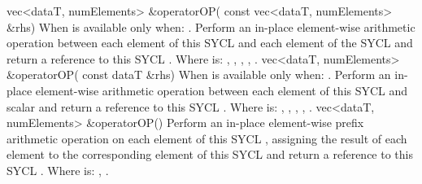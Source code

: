   \addRowTwoL
  {vec<dataT, numElements> \&operatorOP(}
  {  const vec<dataT, numElements> \&rhs)}
  {
    When  is \codeinline{\%=} available only when: .
    \newline
    Perform an in-place element-wise  arithmetic operation between each element of this SYCL  and each element of the  SYCL  and return a reference to this SYCL .
    \newline \newline
    Where  is: \codeinline{+=}, \codeinline{-=}, \codeinline{*=}, \codeinline{/=}, \codeinline{\%=}.
  }
  \addRowTwoL
  {vec<dataT, numElements> \&operatorOP(}
  {  const dataT \&rhs)}
  {
    When  is \codeinline{\%=} available only when: .
    \newline
    Perform an in-place element-wise  arithmetic operation between each element of this SYCL  and  scalar and return a reference to this SYCL .
    \newline \newline
    Where  is: \codeinline{+=}, \codeinline{-=}, \codeinline{*=}, \codeinline{/=}, \codeinline{\%=}.
  }
  \addRow
  {vec<dataT, numElements> \&operatorOP()}
  {
    Perform an in-place element-wise  prefix arithmetic operation on each element of this SYCL , assigning the result of each element to the corresponding element of this SYCL  and return a reference to this SYCL .
    \newline \newline
    Where  is: \codeinline{++}, \codeinline{--}. 
  }
  
